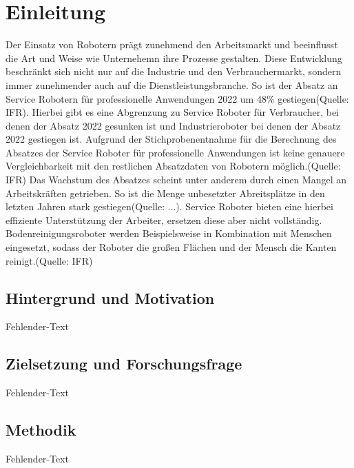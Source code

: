 \section{Einleitung}
Der Einsatz von Robotern prägt zunehmend den Arbeitsmarkt und beeinflusst die Art und Weise wie Unternehemn ihre Prozesse gestalten. Diese Entwicklung beschränkt sich nicht nur auf die Industrie und den Verbrauchermarkt, sondern immer zunehmender auch auf die Dienstleistungsbranche. So ist der Absatz an Service Robotern für professionelle Anwendungen 2022 um 48\% gestiegen(Quelle: IFR). Hierbei gibt es eine Abgrenzung zu Service Roboter für Verbraucher, bei denen der Absatz 2022 gesunken ist und Industrieroboter bei denen der Absatz 2022 gestiegen ist. Aufgrund der Stichprobenentnahme für die Berechnung des Absatzes der Service Roboter für professionelle Anwendungen ist keine genauere Vergleichbarkeit mit den restlichen Absatzdaten von Robotern möglich.(Quelle: IFR) Das Wachstum des Absatzes scheint unter anderem durch einen Mangel an Arbeitskräften getrieben. So ist die Menge unbesetzter Abreitsplätze in den letzten Jahren stark gestiegen(Quelle: ...). Service Roboter bieten eine hierbei effiziente Unterstützung der Arbeiter, ersetzen diese aber nicht vollständig. Bodenreinigungsroboter werden Beispielsweise in Kombination mit Menschen eingesetzt, sodass der Roboter die großen Flächen und der Mensch die Kanten reinigt.(Quelle: IFR)

\subsection{Hintergrund und Motivation}
Fehlender-Text

\subsection{Zielsetzung und Forschungsfrage}
Fehlender-Text

\subsection{Methodik}
Fehlender-Text
